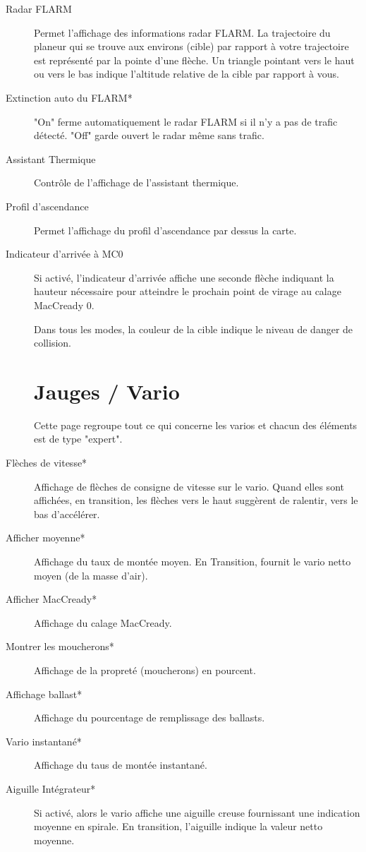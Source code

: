\begin{description}
\item[Radar FLARM]  \label{conf:flarmdisplay} Permet l'affichage des informations radar FLARM. La trajectoire du planeur qui se trouve aux environs (cible) par rapport à votre trajectoire est représenté par la pointe d'une flèche. Un triangle pointant vers le haut ou vers le bas indique l'altitude relative de la cible par rapport à vous. \\
\item[Extinction auto du FLARM*]  "On" ferme automatiquement le radar FLARM si il n'y a pas de trafic détecté. "Off" garde ouvert le radar même sans trafic.
\item[Assistant Thermique] \label{conf:thermalassistant} Contrôle de l'affichage de l'assistant thermique.
\item[Profil d'ascendance] \label{conf:thermalband} Permet l'affichage du profil d'ascendance par dessus la carte.
\item[Indicateur d'arrivée à MC0] Si activé, l'indicateur d'arrivée affiche une seconde flèche indiquant la hauteur nécessaire pour atteindre le prochain point de virage au calage MacCready 0.

Dans tous les modes, la couleur de la cible indique le niveau de danger de collision.


\section{Jauges / Vario}\label{sec:vario-gauge}

Cette page regroupe tout ce qui concerne les varios et chacun des éléments est de type "expert".

\item[Flèches de vitesse*]  \label{conf:variogauge} Affichage de flèches de consigne de vitesse sur le vario. Quand elles sont affichées, en transition, les flèches vers le haut suggèrent de ralentir, vers le bas d'accélérer.
\item[Afficher moyenne*]  Affichage du taux de montée moyen.  En Transition, fournit le vario netto moyen (de la masse d'air).
\item[Afficher MacCready*]  Affichage du calage MacCready.
\item[Montrer les moucherons*]  Affichage de la propreté (moucherons) en pourcent.
\item[Affichage ballast*]  Affichage du pourcentage de remplissage des ballasts.
\item[Vario instantané*]  Affichage du taus de montée instantané.
\item[Aiguille Intégrateur*]  Si activé, alors le vario affiche une aiguille creuse fournissant une indication moyenne en spirale. En transition, l'aiguille indique la valeur netto moyenne.
\end{description}


